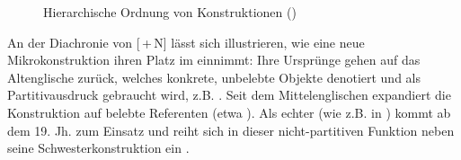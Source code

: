 \begin{figure}
\caption {Hierarchische Ordnung von Konstruktionen   ()\label{abb:quant-schema}}
\end{figure}
 


An der Diachronie von [\,+\,N] lässt sich illustrieren, wie eine neue Mikrokonstruktion  ihren Platz im  einnimmt: Ihre Ursprünge gehen auf das Altenglische  zurück, welches  konkrete, unbelebte  Objekte denotiert und als Partitivausdruck  gebraucht wird, z.B.   \parencite[230]{Traugott2008a}. Seit dem Mittelenglischen expandiert die Konstruktion  auf  belebte  Referenten (etwa ). Als echter  (wie z.B. in  ) kommt  ab dem 19. Jh. zum Einsatz  und reiht sich in dieser nicht-partitiven Funktion neben seine Schwesterkonstruktion  ein \parencite[weiterführend s.][23--24]{Traugott2013}.


